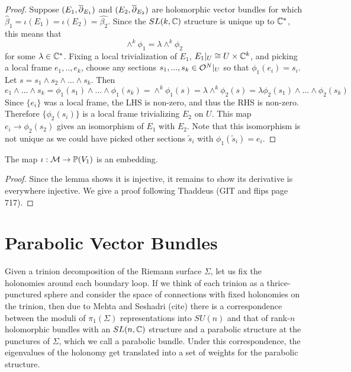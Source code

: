 	\begin{proof}
		 Suppose $(E_1, \overline{\partial}_{E_1})$ and $(E_2, \overline{\partial}_{E_2})$ are holomorphic vector bundles for which $\hat{\beta}_1 = \iota(E_1) = \iota(E_2) = \hat{\beta_2}$. Since the $SL(k,\mathbb{C})$ structure is unique up to $\mathbb{C}^\ast$, this means that
		\begin{equation}
		\wedge^k \phi_1 = \lambda \wedge^k \phi_2
		\end{equation}
		for some $\lambda \in \mathbb{C}^\ast$. Fixing a local trivialization of $E_1$, $E_1|_U \cong U\times \mathbb{C}^k$, and picking a local frame $e_1,..,e_k$, choose any sections $s_1,...,s_k \in \mathcal{O}^N|_{U}$ so that $\phi_1(e_i) = s_i$. Let $s = s_1 \wedge s_2 \wedge ... \wedge s_k$. Then
		\begin{equation}
		e_1\wedge...\wedge s_k=\phi_1(s_1)\wedge...\wedge \phi_1(s_k)= \wedge^k \phi_1(s) = \lambda \wedge^k \phi_2(s) = \lambda \phi_2(s_1)\wedge...\wedge \phi_2(s_k)
		\end{equation}
		Since $\{e_i\}$ was a local frame, the LHS is non-zero, and thus the RHS is non-zero. Therefore $\{\phi_2(s_i)\}$ is a local frame trivializing $E_2$ on $U$. This map $e_i \to \phi_2(s_2)$ gives an isomorphism of $E_1$ with $E_2$. Note that this isomorphism is not unique as we could have picked other sections $\tilde{s}_i$ with $\phi_1(\tilde{s}_i) = e_i$.
	\end{proof}
	\begin{theorem}
		The map $\iota:\mathcal{M} \to \mathbb{P}(V_1)$ is an embedding.
	\end{theorem}
	\begin{proof}
		Since the lemma shows it is injective, it remains to show its derivative is everywhere injective. We give a proof following Thaddeus (GIT and flips page 717).
	\end{proof}

	\section{Parabolic Vector Bundles}
	Given a trinion decomposition of the Riemann surface $\Sigma$, let us fix the holonomies around each boundary loop. If we think of each trinion as a thrice-punctured sphere and consider the space of connections with fixed holonomies on the trinion, then due to Mehta and Seshadri (cite) there is a correspondence between the moduli of $\pi_1(\Sigma)$ representations into $SU(n)$ and that of rank-$n$ holomorphic bundles with an $SL(n,\mathbb{C})$ structure and a parabolic structure at the punctures of $\Sigma$, which we call a parabolic bundle. Under this correspondence, the eigenvalues of the holonomy get translated into a set of weights for the parabolic structure. 
	
